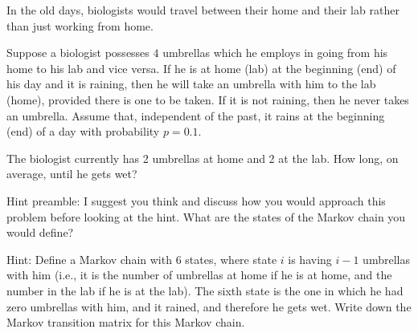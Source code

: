 \documentclass[12pt,letterpaper]{article}
\begin{document}



In the old days, biologists would travel between their home and their lab rather than just  working from home.

Suppose a biologist possesses $4$ umbrellas which he employs in going from his home to his lab and vice versa. If he is at home (lab) at the beginning (end) of his day and it is raining, then he will take an umbrella with him to the lab (home), provided there is one to be taken. If it is not raining, then he never takes an umbrella. Assume that, independent of the past, it rains at the beginning (end) of a day with probability $p=0.1$.

The biologist currently has 2 umbrellas at home and 2 at the lab. How long, on average, until he gets wet? 

\vspace{3em}

Hint preamble: I suggest you think and discuss how you would approach this problem before looking at the hint. What are the states of the Markov chain you would define?

Hint: Define a Markov chain with $6$ states, where state $i$ is having $i-1$ umbrellas with him (i.e., it is the number of umbrellas at home if he is at home, and the number in the lab if he is at the lab). The sixth state is the one in which he had zero umbrellas with him, and it rained, and therefore he gets wet. Write down the Markov transition matrix for this Markov chain. 



\end{document}
